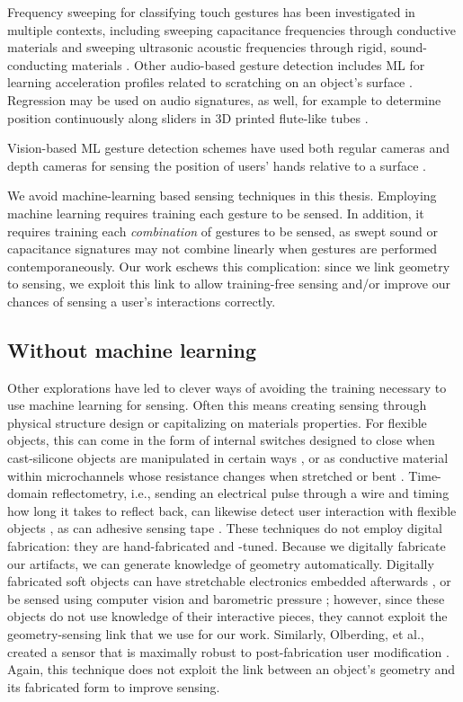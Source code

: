     Frequency sweeping for classifying touch gestures has been investigated in multiple contexts, including sweeping capacitance frequencies through conductive materials \cite{sato-touche} and sweeping ultrasonic acoustic frequencies through rigid, sound-conducting materials \cite{ono-touchandactivate}. Other audio-based gesture detection includes ML for learning acceleration profiles related to scratching on an object's surface \cite{harrison-scratchinput,murray-smith-stane}. Regression may be used on audio signatures, as well, for example to determine position continuously along sliders in 3D printed flute-like tubes \cite{laput-acoustruments} .
    
    Vision-based ML gesture detection schemes have used both regular cameras and depth cameras for sensing the position of users' hands relative to a surface \cite{fails-crayons,holman-sketchspace,klemmer-papiermache,macintyre-DART}.
    
    We avoid machine-learning based sensing techniques in this thesis. Employing machine learning requires training each gesture to be sensed. In addition, it requires training each \emph{combination} of gestures to be sensed, as swept sound or capacitance signatures may not combine linearly when gestures are performed contemporaneously. Our work eschews this complication: since we link geometry to sensing, we exploit this link to allow training-free sensing and/or improve our chances of sensing a user's interactions correctly.

    \subsection{Without machine learning}
        Other explorations have led to clever ways of avoiding the training necessary to use machine learning for sensing. Often this means creating sensing through physical structure design or capitalizing on materials properties. For flexible objects, this can come in the form of internal switches designed to close when cast-silicone objects are manipulated in certain ways \cite{slyper-structure}, or as conductive material within microchannels whose resistance changes when stretched or bent \cite{majidi-curvature, park-microchannels}. Time-domain reflectometry, i.e., sending an electrical pulse through a wire and timing how long it takes to reflect back, can likewise detect user interaction with flexible objects \cite{wimmer-tdr}, as can adhesive sensing tape \cite{holman-tactiletape}. These techniques do not employ digital fabrication: they are hand-fabricated and -tuned. Because we digitally fabricate our artifacts, we can generate knowledge of geometry automatically. Digitally fabricated soft objects can have stretchable electronics embedded afterwards \cite{yao-pneui}, or be sensed using computer vision and barometric pressure \cite{harrison-buttons, slyper-pressure}; however, since these objects do not use knowledge of their interactive pieces, they cannot exploit the geometry-sensing link that we use for our work. Similarly, Olberding, et al., created a sensor that is maximally robust to post-fabrication user modification \cite{olberding-cuttable}. Again, this technique does not exploit the link between an object's geometry and its fabricated form to improve sensing.

